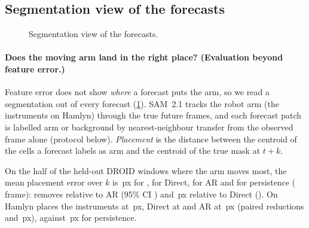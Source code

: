 \subsection{Segmentation view of the forecasts}\label{app:segments}
\begin{figure}[h]
  \centering
  \caption[Segmentation view of the forecasts]{\ifdefined\segCaption\segCaption\else Segmentation view of the forecasts.\fi}
  \label{fig:segments}
\end{figure}

\paragraph{Does the moving arm land in the right place? (Evaluation beyond feature error.)} Feature error does not show \emph{where} a forecast puts the
arm, so we read a segmentation out of every forecast (\cref{fig:segments}). SAM~2.1 \citep{ravi2025sam2} tracks the robot
arm (the instruments on Hamlyn) through the true future frames, and each forecast patch is labelled arm or background by
nearest-neighbour transfer from the observed frame alone (protocol below). \emph{Placement} is the distance between the
centroid of the cells a forecast labels as arm and the centroid of the true mask at $t{+}k$.

On the half of the
\segDroidWindows{} held-out DROID windows where the arm moves most, the mean placement error over $k$ is
\segDroidPlaceSW{}\,px for \ours{}, \segDroidPlaceDi{} for Direct, \segDroidPlaceAR{} for AR and \segDroidPlacePers{} for
persistence (\segDroidPlaceFrame{} frame): \ours{} removes  relative to AR (95\% CI
\segDroidPlaceRedARCI{}) and \segDroidPlaceRedDi{}\,px relative to Direct (\segDroidPlaceRedDiCI{}). On Hamlyn
\ours{} places the instruments at \segHamlynPlaceSW{}\,px, Direct at \segHamlynPlaceDi{} and AR at \segHamlynPlaceAR{}\,px
(paired reductions \segHamlynPlaceRedDi{} \segHamlynPlaceRedDiCI{} and \segHamlynPlaceRedAR{} \segHamlynPlaceRedARCI{}\,px),
against \segHamlynPlacePers{}\,px for persistence.

